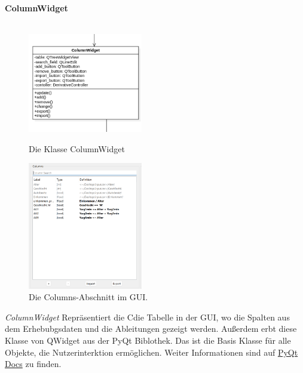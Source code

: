 \documentclass{article}
\begin{document}
\newpage
\textbf{\large{ColumnWidget}}\\\\
\begin{figure}[H]%
    \centering
    \begin{minipage}[b]{0.4\textwidth}
        \includegraphics[width=5cm]{entwurf/Entwurf_dokument/img/Alissa/ColumnWidget.png}
        \caption{Die Klasse ColumnWidget}
    \end{minipage}
    \hfill
    \begin{minipage}[b]{0.4\textwidth}
        \includegraphics[width=5cm]{entwurf/Entwurf_dokument/img/Alissa/Columns.png} 
    \caption{Die Columns-Abschnitt im GUI.}
    \end{minipage}
\end{figure}
\textit{ColumnWidget} Repräsentiert die Cdie Tabelle in der GUI, wo die Spalten aus dem Erhebubgsdaten und die Ableitungen gezeigt werden. Außerdem erbt diese Klasse von QWidget aus der PyQt Biblothek.  Das ist die Basis Klasse für alle Objekte, die Nutzerinterktion ermöglichen. Weiter Informationen sind auf \href{https://doc.qt.io/qt-6/qwidget.html}{PyQt Docs} zu finden.
\newline \newline
\end{document}
